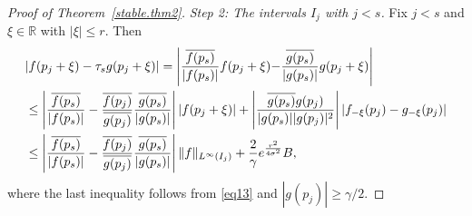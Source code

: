 \documentclass[11pt, reqno]{amsart}
\newcommand{\R}{\mathbb{R}}
\numberwithin{equation}{section}
\begin{document}
\begin{proof}[Proof of Theorem~\ref{stable.thm2}]
\medskip
\noindent
\emph{Step 2: The intervals \(I_j\) with \(j<s\).}
Fix $j<s$ and $\xi\in\R$ with $|\xi|\le r$. Then
 \begin{align}\label{stable.thm.eq.left1}
  &    |f(p_j + \xi) - \tau_s g(p_j + \xi)|%
       =   \left|\frac{\overline{f(p_s)}}{|f(p_s)|} f(p_j + \xi) \hskip-.03in - \hskip-.03in \frac{\overline{g(p_s)}}{|g(p_s)|} g(p_j + \xi)\right| \hskip-.05in \notag\\
     &    \le  \left| \frac{\overline{f(p_s)} }{|f(p_s)|} -   \frac{\overline{f(p_j)}}{\overline{g(p_j)}} \frac{\overline{g(p_s)}}{|g(p_s)|} \right|  |f(p_j  + \xi)|   %
     + \left| \frac{\overline{g(p_s)} g(p_j)}{|g(p_s)| |g(p_j)|^2} \right| |f_ {-\xi}(p_j) - g_{-\xi}(p_j )| 
      \notag  \\
 &     \le  \left| \frac{\overline{f(p_s)}}{|f(p_s)|} - \frac{\overline{f(p_j)}}{\overline{g(p_j)}} \frac{\overline{g(p_s)}}{|g(p_s)|} \right| \|f\|_{L^{\infty}(I_j)} +\frac{2}{\gamma} e^{\frac{r^2}{4\sigma^2}}B, 
    \end{align}
where the last inequality follows from \eqref{eq13} and 
$|g(p_j)|\ge \gamma/2$.



\end{proof}
\end{document}
